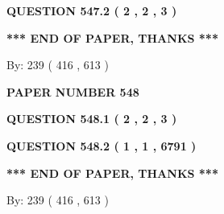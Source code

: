 \documentclass[12pt]{article}
\begin{document}
  
  
\vspace{0.2in}
  
{\textbf{\Large{QUESTION
547.2 
 ( 2 , 2 , 3 )
}}}
  
  
   
   
 \vspace{0.2in}
 
   
   
   
   
\vspace{1.0in} 
{\textbf{\large{ *** END OF PAPER, THANKS *** }}} 
   
   
\hspace{1.0in} By: 
 239 ( 416 ,  613 )
   
   
   
   
\newpage 
\setcounter{page}{ 
   548001 } 
   
   
   
   
 {\textbf{ \Large{ PAPER NUMBER  548  }}}
   
   
\vspace{0.2in}
   
   
   
   
   
   
 \vspace{0.2in}
 
 
 
 
   
   
  
\vspace{0.2in}
  
{\textbf{\Large{QUESTION
548.1 
 ( 2 , 2 , 3 )
}}}
  
  
  
\vspace{0.2in}
  
{\textbf{\Large{QUESTION
548.2 
 ( 1 , 1 , 6791 )
}}}
  
  
   
   
 \vspace{0.2in}
 
   
   
   
   
\vspace{1.0in} 
{\textbf{\large{ *** END OF PAPER, THANKS *** }}} 
   
   
\hspace{1.0in} By: 
 239 ( 416 ,  613 )
   
   
   
\end{document}
